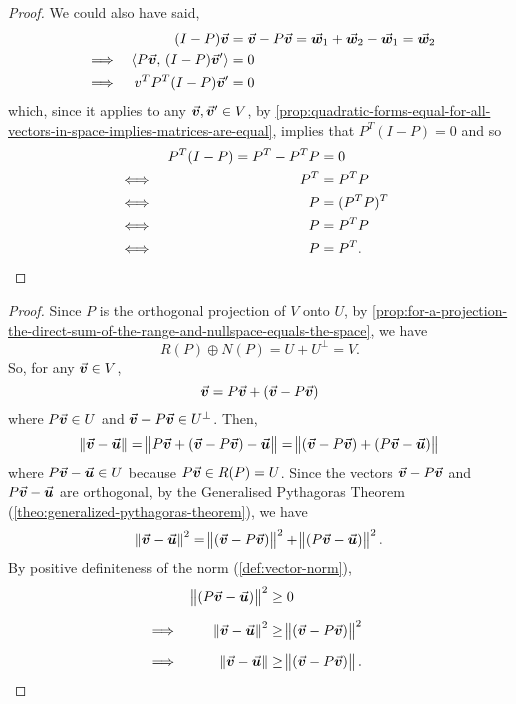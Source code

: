 \documentclass[../MathsNotesBase.tex]{subfiles}
\begin{document}
{\begin{proof}
		We could also have said,
		\[\begin{aligned}
			&&(I - P)\vec{\bm{v}} &= \vec{\bm{v}} - P\vec{\bm{v}} = \vec{\bm{w}}_1 + \vec{\bm{w}}_2 - \vec{\bm{w}}_1 = \vec{\bm{w}}_2 \\
			&\implies & \langle P\vec{\bm{v}},\, (I - P)\vec{\bm{v}}' \rangle &= 0 \\
			&\implies & v^T P^T (I - P) \vec{\bm{v}}' &= 0
		\end{aligned}\]
		which, since it applies to any ${ \vec{\bm{v}},\vec{\bm{v}}' \in V }$, by \autoref{prop:quadratic-forms-equal-for-all-vectors-in-space-implies-matrices-are-equal}, implies that ${ P^T (I - P) = 0 }$ and so
		\[\begin{aligned}
			&& P^T (I - P) = P^T - P^TP &= 0 \\
			&\iff & P^T &= P^T P &\text{\scriptsize{}} \\
			&\iff & P &= (P^T P)^T &\text{\scriptsize{}} \\
			&\iff & P &= P^T P &\text{\scriptsize{}} \\
			&\iff & P &= P^T.
		\end{aligned}\]
	\end{proof}


	\bigskip
	\begin{proof}
		Since $P$ is the orthogonal projection of $V$ onto $U$, by \autoref{prop:for-a-projection-the-direct-sum-of-the-range-and-nullspace-equals-the-space}, we have
		\[ R(P) \oplus N(P) = U + U^\perp = V. \]
		So, for any ${ \vec{\bm{v}} \in V }$,
		\[ \vec{\bm{v}} = P\vec{\bm{v}} + (\vec{\bm{v}} - P\vec{\bm{v}}) \]
		where ${ P\vec{\bm{v}} \in U }$ and ${ \vec{\bm{v}} - P\vec{\bm{v}} \in U^\perp }$. 
		Then,
		\[ \norm{\vec{\bm{v}} - \vec{\bm{u}}} = \norm{P\vec{\bm{v}} + (\vec{\bm{v}} - P\vec{\bm{v}}) - \vec{\bm{u}}} = \norm{(\vec{\bm{v}} - P\vec{\bm{v}}) + (P\vec{\bm{v}} - \vec{\bm{u}})}  \]
		where ${ P\vec{\bm{v}} - \vec{\bm{u}} \in U }$ because ${ P\vec{\bm{v}} \in R(P) = U }$. Since the vectors ${ \vec{\bm{v}} - P\vec{\bm{v}} }$ and ${ P\vec{\bm{v}} - \vec{\bm{u}} }$ are orthogonal, by the Generalised Pythagoras Theorem (\autoref{theo:generalized-pythagoras-theorem}), we have
		\[ \norm{\vec{\bm{v}} - \vec{\bm{u}}}^2 = \norm{(\vec{\bm{v}} - P\vec{\bm{v}})}^2 + \norm{(P\vec{\bm{v}} - \vec{\bm{u}})}^2. \]
		By positive definiteness of the norm (\ref{def:vector-norm}),
		\[\begin{aligned}
			&&\norm{(P\v - \u)}^2 &\geq 0 \nn
			&\implies & \norm{\v - \u}^2 &\geq \norm{(\v - P\v)}^2 &\sidecomment{} \nn
			&\implies & \norm{\v - \u} &\geq \norm{(\v - P\v)}.  \qedhere
		\end{aligned}\]
	\end{proof}


}
\end{document}
